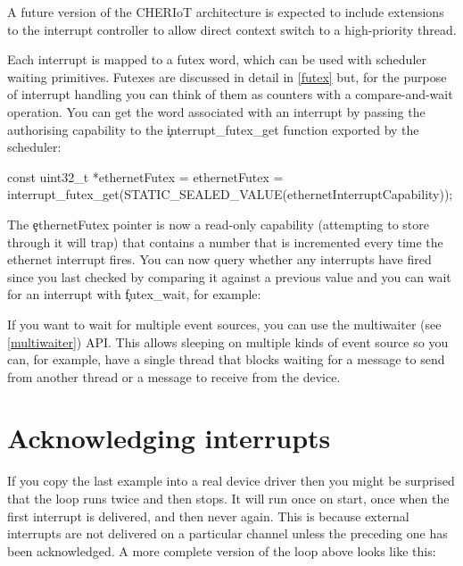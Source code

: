 \begin{note}
A future version of the CHERIoT architecture is expected to include extensions to the interrupt controller to allow direct context switch to a high-priority thread.
\end{note}

Each interrupt is mapped to a futex word, which can be used with scheduler waiting primitives.
Futexes are discussed in detail in \ref{futex} but, for the purpose of interrupt handling you can think of them as counters with a compare-and-wait operation.
You can get the word associated with an interrupt by passing the authorising capability to the \c{interrupt_futex_get} function exported by the scheduler:

\begin{cxxsnippet}
const uint32_t *ethernetFutex = ethernetFutex =
	interrupt_futex_get(STATIC_SEALED_VALUE(ethernetInterruptCapability));
\end{cxxsnippet}

The \c{ethernetFutex} pointer is now a read-only capability (attempting to store through it will trap) that contains a number that is incremented every time the ethernet interrupt fires.
You can now query whether any interrupts have fired since you last checked by comparing it against a previous value and you can wait for an interrupt with \c{futex_wait}, for example:

\begin{cxxsnippet}
[,cpp]
do
{
    uint32_t last = *ethernetFutex;
    // Handle interrupt here
\} while (futex_wait(ethernetFutex, last) == 0);
\end{cxxsnippet}

If you want to wait for multiple event sources, you can use the multiwaiter (see \ref{multiwaiter}) API.
This allows sleeping on multiple kinds of event source so you can, for example, have a single thread that blocks waiting for a message to send from another thread or a message to receive from the device.

\section{Acknowledging interrupts}

If you copy the last example into a real device driver then you might be surprised that the loop runs twice and then stops.
It will run once on start, once when the first interrupt is delivered, and then never again.
This is because external interrupts are not delivered on a particular channel unless the preceding one has been acknowledged.
A more complete version of the loop above looks like this:

